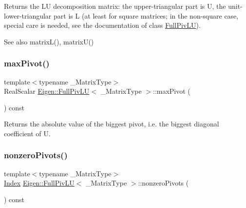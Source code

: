 \begin{DoxyReturn}{Returns}
the LU decomposition matrix\+: the upper-\/triangular part is U, the unit-\/lower-\/triangular part is L (at least for square matrices; in the non-\/square case, special care is needed, see the documentation of class \mbox{\hyperlink{class_eigen_1_1_full_piv_l_u}{Full\+Piv\+LU}}).
\end{DoxyReturn}
\begin{DoxySeeAlso}{See also}
matrix\+L(), matrix\+U() 
\end{DoxySeeAlso}
\mbox{\label{class_eigen_1_1_full_piv_l_u_abced9f280f5fc49c2e62605c782b237b}} 
\subsubsection{\texorpdfstring{maxPivot()}{maxPivot()}}
{\footnotesize\ttfamily template$<$typename \+\_\+\+Matrix\+Type$>$ \\
Real\+Scalar \mbox{\hyperlink{class_eigen_1_1_full_piv_l_u}{Eigen\+::\+Full\+Piv\+LU}}$<$ \+\_\+\+Matrix\+Type $>$\+::max\+Pivot (\begin{DoxyParamCaption}{ }\end{DoxyParamCaption}) const\hspace{0.3cm}{\ttfamily [inline]}}

\begin{DoxyReturn}{Returns}
the absolute value of the biggest pivot, i.\+e. the biggest diagonal coefficient of U. 
\end{DoxyReturn}
\mbox{\label{class_eigen_1_1_full_piv_l_u_aa71132a751ad3c78178e33d6b2987400}} 
\subsubsection{\texorpdfstring{nonzeroPivots()}{nonzeroPivots()}}
{\footnotesize\ttfamily template$<$typename \+\_\+\+Matrix\+Type$>$ \\
\mbox{\hyperlink{struct_eigen_1_1_eigen_base_a554f30542cc2316add4b1ea0a492ff02}{Index}} \mbox{\hyperlink{class_eigen_1_1_full_piv_l_u}{Eigen\+::\+Full\+Piv\+LU}}$<$ \+\_\+\+Matrix\+Type $>$\+::nonzero\+Pivots (\begin{DoxyParamCaption}{ }\end{DoxyParamCaption}) const\hspace{0.3cm}{\ttfamily [inline]}}


